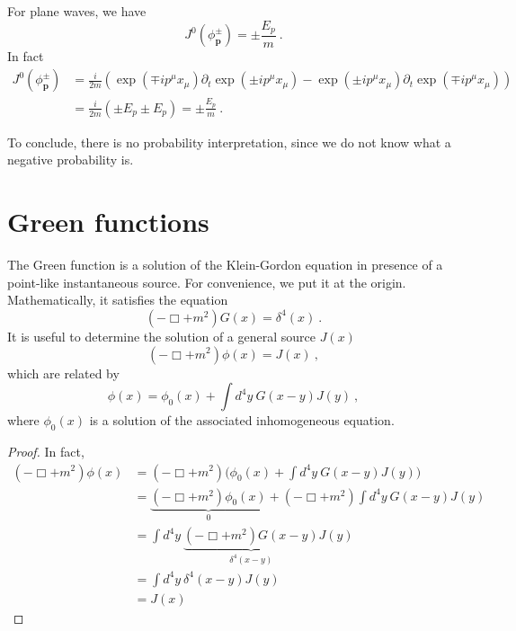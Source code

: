    \begin{example}
        For plane waves, we have 
        \begin{equation*}
            J^0 (\phi^\pm_{\mathbf p}) = \pm \frac{E_p}{m} ~.
        \end{equation*}
        In fact 
        \begin{equation*}
        \begin{aligned}
            J^0 (\phi^\pm_{\mathbf p}) & = \frac{i}{2m} (\exp(\mp i p^\mu x_\mu) \partial_t \exp(\pm i p^\mu x_\mu) - \exp(\pm i p^\mu x_\mu) \partial_t \exp(\mp i p^\mu x_\mu) ) \\ & = \frac{i}{2m} (\pm E_p \pm E_p) = \pm \frac{E_p}{m} ~.
        \end{aligned}
        \end{equation*}
    \end{example}
    To conclude, there is no probability interpretation, since we do not know what a negative probability is.

\section{Green functions}

    The Green function is a solution of the Klein-Gordon equation in presence of a point-like instantaneous source. For convenience, we put it at the origin. Mathematically, it satisfies the equation 
    \begin{equation*}
        (- \Box + m^2) G(x) = \delta^4 (x) ~.
    \end{equation*}
    It is useful to determine the solution of a general source $J(x)$ 
    \begin{equation*}
        (- \Box + m^2) \phi(x) = J (x) ~,
    \end{equation*}
    which are related by 
    \begin{equation*}
        \phi (x) = \phi_0 (x) + \int d^4y ~ G(x-y) J (y) ~,
    \end{equation*}
    where $\phi_0 (x)$ is a solution of the associated inhomogeneous equation.
    \begin{proof}
        In fact, 
        \begin{equation*}
        \begin{aligned}
            (- \Box + m^2) \phi(x) & =  (- \Box + m^2) \Big (\phi_0 (x) + \int d^4y ~ G(x-y) J (y) \Big ) \\ & = \underbrace{(- \Box + m^2) \phi_0 (x)}_0 + (- \Box + m^2) \int d^4y ~ G(x-y) J (y) \\ & =  \int d^4y ~ \underbrace{(- \Box + m^2) G(x-y)}_{\delta^4(x-y)} J (y) \\ & = \int d^4 y ~ \delta^4(x-y) J(y) \\ & = J(x)
        \end{aligned}
        \end{equation*}
    \end{proof}

